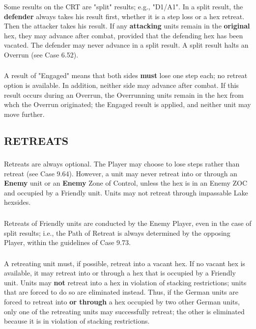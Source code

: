 \subsubsection{} Some results on the CRT are "split" results; e.g., "D1/A1". In a split result, the \textbf{defender} always takes his result first, whether it is a step loss or a hex retreat. Then the attacker takes his result. If any \textbf{attacking} units remain in the \textbf{original} hex, they may advance after combat, provided that the defending hex has been vacated. The defender may never advance in a split result. A split result halts an Overrun (see Case 6.52).

\subsubsection{} A result of "Engaged" means that both sides \textbf{must} lose one step each; no retreat option is available. In addition, neither side may advance after combat. If this result occurs during an Overrun, the Overrunning units remain in the hex from whch the Overrun originated; the Engaged result is applied, and neither unit may move further.

\subsection{RETREATS}

\subsubsection{} Retreats are always optional. The Player may choose to lose steps rather than retreat (see Case 9.64). However, a unit may never retreat into or through an \textbf{Enemy} unit or an \textbf{Enemy} Zone of Control, unless the hex is in an Enemy ZOC and occupied by a Friendly unit. Units may not retreat through impassable Lake hexsides.

\subsubsection{} Retreats of Friendly units are conducted by the Enemy Player, even in the case of split results; i.e., the Path of Retreat is always determined by the opposing Player, within the guidelines of Case 9.73.

\subsubsection{} A retreating unit must, if possible, retreat into a vacant hex. If no vacant hex is available, it may retreat into or through a hex that is occupied by a Friendly unit. Units may \textbf{not} retreat into a hex in violation of stacking restrictions; units that are forced to do so are eliminated instead. Thus, if the German units are forced to retreat into \textbf{or through} a hex occupied by two other German units, only one of the retreating units may successfully retreat; the other is eliminated because it is in violation of stacking restrictions.

